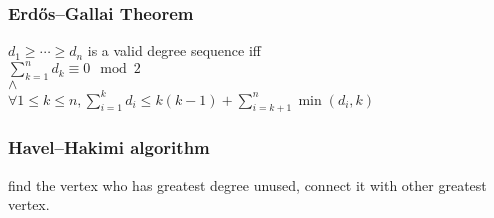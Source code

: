 \subsubsection{Erdős–Gallai Theorem}
$d_1 \geq \cdots \geq d_n$ is a valid degree sequence iff \\
$\sum_{k=1}^{n} d_k \equiv 0 \mod{2} $\\
$\land$\\
$\forall 1 \leq k \leq n, \sum^{k}_{i=1}d_i\leq k(k-1)+ \sum^n_{i=k+1} \min (d_i,k)$
\subsubsection{Havel–Hakimi algorithm}
find the vertex who has greatest degree unused, connect it with other greatest vertex.
